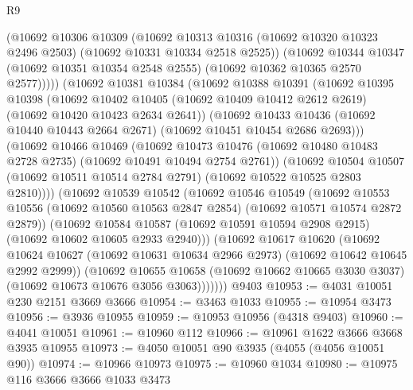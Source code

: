 \begin{lexlean}{R9}
\begin{coremodule}
            (@10692
              @10306
              @10309
              (@10692
                @10313
                @10316
                (@10692 @10320 @10323 @2496 @2503)
                (@10692 @10331 @10334 @2518 @2525))
              (@10692
                @10344
                @10347
                (@10692 @10351 @10354 @2548 @2555)
                (@10692 @10362 @10365 @2570 @2577)))))
        (@10692
          @10381
          @10384
          (@10692
            @10388
            @10391
            (@10692
              @10395
              @10398
              (@10692
                @10402
                @10405
                (@10692 @10409 @10412 @2612 @2619)
                (@10692 @10420 @10423 @2634 @2641))
              (@10692
                @10433
                @10436
                (@10692 @10440 @10443 @2664 @2671)
                (@10692 @10451 @10454 @2686 @2693)))
            (@10692
              @10466
              @10469
              (@10692
                @10473
                @10476
                (@10692 @10480 @10483 @2728 @2735)
                (@10692 @10491 @10494 @2754 @2761))
              (@10692
                @10504
                @10507
                (@10692 @10511 @10514 @2784 @2791)
                (@10692 @10522 @10525 @2803 @2810))))
          (@10692
            @10539
            @10542
            (@10692
              @10546
              @10549
              (@10692
                @10553
                @10556
                (@10692 @10560 @10563 @2847 @2854)
                (@10692 @10571 @10574 @2872 @2879))
              (@10692
                @10584
                @10587
                (@10692 @10591 @10594 @2908 @2915)
                (@10692 @10602 @10605 @2933 @2940)))
            (@10692
              @10617
              @10620
              (@10692
                @10624
                @10627
                (@10692 @10631 @10634 @2966 @2973)
                (@10692 @10642 @10645 @2992 @2999))
              (@10692
                @10655
                @10658
                (@10692 @10662 @10665 @3030 @3037)
                (@10692 @10673 @10676 @3056 @3063)))))))
    @9403
@10953 := @4031 @10051 @230 @2151 @3669 @3666
@10954 := @3463 @1033
@10955 := @10954 @3473
@10956 := @3936 @10955
@10959 := @10953 @10956 (@4318 @9403)
@10960 := @4041 @10051
@10961 := @10960 @112
@10966 := @10961 @1622 @3666 @3668 @3935 @10955
@10973 := @4050 @10051 @90 @3935 (@4055 (@4056 @10051 @90))
@10974 := @10966 @10973
@10975 := @10960 @1034
@10980 := @10975 @116 @3666 @3666 @1033 @3473

\end{coremodule}
\end{lexlean}

